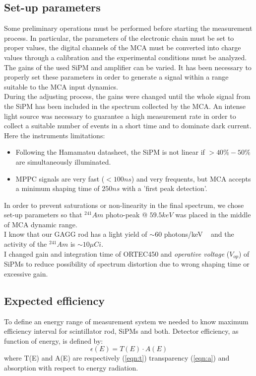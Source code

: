 \documentclass[10pt,a4paper, openany]{book}
\begin{document}
\subsection{Set-up parameters}
Some preliminary operations must be performed before starting the measurement process. In particular, the parameters of the electronic chain must be set to proper values, the digital channels of the MCA must be converted into charge values through a calibration and the experimental conditions must be analyzed.\\[2ex]
The gains of the used SiPM and amplifier can be varied. It has been necessary to properly set these parameters in order to generate a signal within a range suitable to the MCA input dynamics.\\
During the adjusting process, the gains were changed until the whole signal from the SiPM has been included in the spectrum collected by the MCA. An intense light source was necessary to guarantee a high measurement rate in order to collect a suitable number of events in a short time and to dominate dark current.\\
Here the instruments limitations:
\begin{itemize}
\item Following the Hamamatsu datasheet, the SiPM is not linear if $> 40 \% - 50\%$ are simultaneously illuminated.
\item MPPC signals are very fast ($<100ns$) and very frequents, but MCA accepts a minimum shaping time of $250ns$ with a 'first peak detection'.
\end{itemize}
In order to prevent saturations or non-linearity in the final spectrum, we chose set-up parameters so that $^{241}Am$ photo-peak @ $59.5 keV$ was placed in the middle of MCA dynamic range.\\
I know that our GAGG rod has a light yield of $\sim 60$ photons/keV ~\cite{gagg:1} and the activity of the $^{241}Am$ is $\sim 10\mu Ci$.\\
I changed gain and integration time of ORTEC450 and \emph{operative voltage} ($V_{op}$) of SiPMs to reduce possibility of spectrum distortion due to wrong shaping time or excessive gain.

\subsection{Expected efficiency}
To define an energy range of measurement system we needed to know maximum efficiency interval for scintillator rod, SiPMs and both.
Detector efficiency, as function of energy, is defined by:
\begin{equation}
\epsilon(E) = T(E)\cdot A(E)
\end{equation}
where T(E) and A(E) are respectively (\ref{eqn:t}) transparency (\ref{eqn:a}) and absorption with respect to energy radiation.
\end{document}

